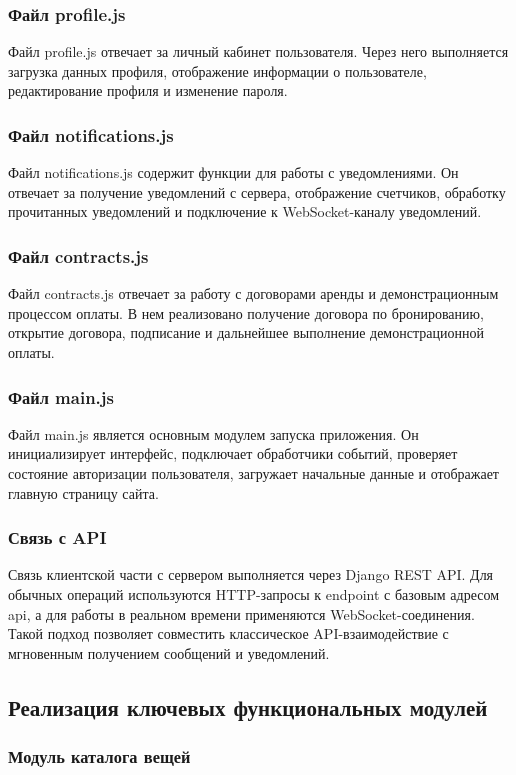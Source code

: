 \subsubsection{Файл profile.js}
Файл profile.js отвечает за личный кабинет пользователя. Через него выполняется загрузка данных профиля, отображение информации о пользователе, редактирование профиля и изменение пароля.

\subsubsection{Файл notifications.js}
Файл notifications.js содержит функции для работы с уведомлениями. Он отвечает за получение уведомлений с сервера, отображение счетчиков, обработку прочитанных уведомлений и подключение к WebSocket-каналу уведомлений.

\subsubsection{Файл contracts.js}
Файл contracts.js отвечает за работу с договорами аренды и демонстрационным процессом оплаты. В нем реализовано получение договора по бронированию, открытие договора, подписание и дальнейшее выполнение демонстрационной оплаты.

\subsubsection{Файл main.js}
Файл main.js является основным модулем запуска приложения. Он инициализирует интерфейс, подключает обработчики событий, проверяет состояние авторизации пользователя, загружает начальные данные и отображает главную страницу сайта.

\subsubsection{Связь с API}
Связь клиентской части с сервером выполняется через Django REST API. Для обычных операций используются HTTP-запросы к endpoint с базовым адресом api, а для работы в реальном времени применяются WebSocket-соединения. Такой подход позволяет совместить классическое API-взаимодействие с мгновенным получением сообщений и уведомлений.

\subsection{Реализация ключевых функциональных модулей}
\subsubsection{Модуль каталога вещей}


